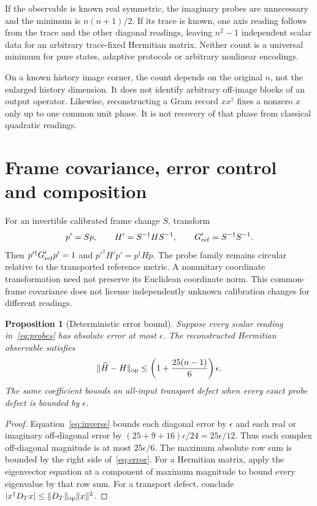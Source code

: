 \documentclass[11pt,a4paper]{article}
\newtheorem{proposition}[theorem]{Proposition}
\newcommand{\adj}{\dagger}
\begin{document}
If the observable is known real symmetric, the imaginary probes are
unnecessary and the minimum is $n(n+1)/2$. If its trace is known, one axis
reading follows from the trace and the other diagonal readings, leaving
$n^2-1$ independent scalar data for an arbitrary trace-fixed Hermitian
matrix. Neither count is a universal minimum for pure states, adaptive
protocols or arbitrary nonlinear encodings.

On a known history image corner, the count depends on the original $n$,
not the enlarged history dimension. It does not identify arbitrary
off-image blocks of an output operator. Likewise, reconstructing a Gram
record $xx^\adj$ fixes a nonzero $x$ only up to one common unit phase.
It is not recovery of that phase from classical quadratic readings.

\section{Frame covariance, error control and composition}\label{sec:error}

For an invertible calibrated frame change $S$, transform
\begin{equation}
p'=Sp,\qquad H'=S^{-\adj}HS^{-1},\qquad
G'_{\rm ref}=S^{-\adj}S^{-1}.
\end{equation}
Then $p'^\adj G'_{\rm ref}p'=1$ and $p'^\adj H'p'=p^\adj Hp$.
The probe family remains circular relative to the transported reference
metric. A nonunitary coordinate transformation need not preserve its
Euclidean coordinate norm. This common-frame covariance does not license
independently unknown calibration changes for different readings.

\begin{proposition}[Deterministic error bound]
Suppose every scalar reading in~\eqref{eq:probes} has absolute error at
most $\epsilon$. The reconstructed Hermitian observable satisfies
\begin{equation}\label{eq:error}
\|\widehat H-H\|_{\rm op}\leq
\left(1+\frac{25(n-1)}6\right)\epsilon.
\end{equation}
The same coefficient bounds an all-input transport defect when every exact
probe defect is bounded by $\epsilon$.
\end{proposition}
\begin{proof}
Equation~\eqref{eq:inverse} bounds each diagonal error by $\epsilon$ and
each real or imaginary off-diagonal error by
$(25+9+16)\epsilon/24=25\epsilon/12$. Thus each complex off-diagonal
magnitude is at most $25\epsilon/6$. The maximum absolute row sum is
bounded by the right side of~\eqref{eq:error}. For a Hermitian matrix,
apply the eigenvector equation at a component of maximum magnitude to
bound every eigenvalue by that row sum. For a transport defect, conclude
$|x^\adj D_Tx|\leq\|D_T\|_{\rm op}\|x\|^2$.
\end{proof}
\end{document}
